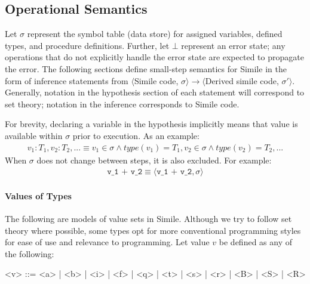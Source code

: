 
\subsection{Operational Semantics}
Let $\sigma$ represent the symbol table (data store) for assigned variables, defined types, and procedure definitions. Further, let $\bot$ represent an error state; any operations that do not explicitly handle the error state are expected to propagate the error. The following sections define small-step semantics for Simile in the form of inference statements from $\langle$Simile code, $\sigma \rangle \to \langle$Derived simile code, $\sigma' \rangle$.  Generally, notation in the hypothesis section of each statement will correspond to set theory; notation in the inference corresponds to Simile code.

For brevity, declaring a variable in the hypothesis implicitly means that value is available within $\sigma$ prior to execution. As an example:
\begin{gather*}
  v_1: T_1, v_2: T_2, ... \equiv v_1 \in \sigma \land type(v_1) = T_1, v_2 \in \sigma \land type(v_2) = T_2 , ...
\end{gather*}
When $\sigma$ does not change between steps, it is also excluded. For example:
\begin{gather*}
  \texttt{v_1 + v_2} \equiv \langle \texttt{v_1 + v_2}, \sigma \rangle
\end{gather*}
%
%
%
%
\paragraph{Values of Types}
The following are models of value sets in Simile. Although we try to follow set theory where possible, some types opt for more conventional programming styles for ease of use and relevance to programming. Let value $v$ be defined as any of the following:
\begin{grammar}
<v> ::= <a> | <b> | <i> | <f> | <q> | <t> | <s> | <r> | <B> | <S> | <R>
\end{grammar}
